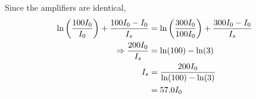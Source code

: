 \begin{parts}
	Since the amplifiers are identical,
	\begin{align*}
		\ln\left(\frac{100I_0}{I_0}\right) + \frac{100I_0 - I_0}{I_s} &= \ln\left(\frac{300I_0}{100I_0}\right) + \frac{300I_0 - I_0}{I_s} \\
		\Rightarrow \frac{200I_0}{I_s} &= \ln(100) - \ln(3) \\
		I_s &= \frac{200I_0}{\ln(100) - \ln(3)} \\
		&= \num{57.0}I_0
	\end{align*}
\end{parts}